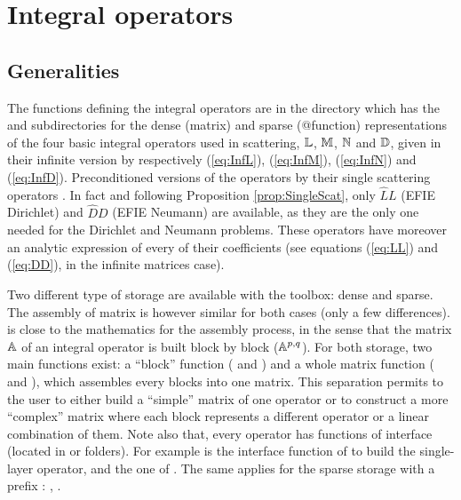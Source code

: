 \section{Integral operators}
\label{sec:ResolutionMuDiff}

\subsection{Generalities}

The functions defining the integral operators are in the directory  which has the 
and  subdirectories for the dense (matrix) and sparse (@function) representations of the four basic integral operators used in scattering,
\ie ${\mathbb{L}}$, ${\mathbb{M}}$, ${\mathbb{N}}$ and ${\mathbb{D}}$, given in their infinite version by respectively (\ref{eq:InfL}), (\ref{eq:InfM}), (\ref{eq:InfN}) and (\ref{eq:InfD}). Preconditioned versions of the operators by their single scattering operators \cite{Thi14}. In fact and following Proposition \ref{prop:SingleScat}, only $\widehat{L}L$ (EFIE Dirichlet) and $\widehat{D}D$ (EFIE Neumann) are available, as they are the only one needed for the Dirichlet and Neumann problems. These operators have moreover an analytic expression of every of their coefficients (see equations (\ref{eq:LL}) and (\ref{eq:DD}), in the infinite matrices case).

Two different type of storage are available with the \mudiff toolbox: dense and sparse. The assembly of matrix is however similar for both cases (only a few differences). \mudiff is close to the mathematics for the assembly process, in the sense that the matrix ${\mathbb{A}}$ of an integral operator is built block by block ($\mathbb{A}^{p,q}$). For both storage, two main functions exist: a ``block'' function ( and ) and a whole matrix function ( and ), which assembles every blocks into one matrix. This separation permits to the user to either build a ``simple'' matrix of one operator or to construct a more ``complex'' matrix where each block represents a different operator or a linear combination of them. Note also that, every operator has functions of interface (located in  or  folders). For example  is the interface function of  to build the single-layer operator, and  the one of . The same applies for the sparse storage with a prefix :  ,  .


